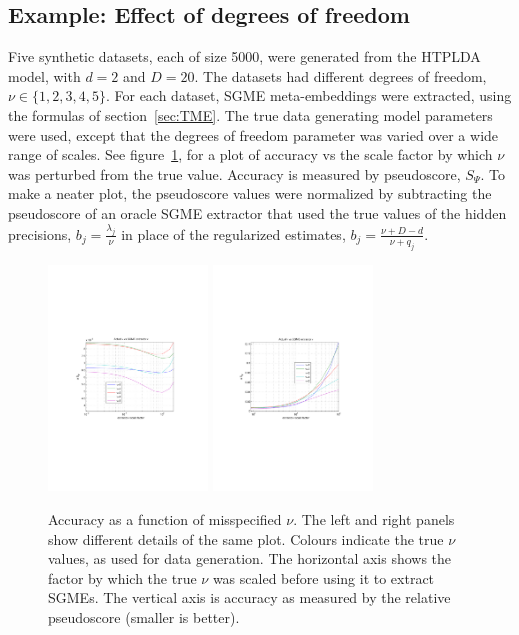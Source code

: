 \documentclass[a4paper,oneside,12pt,english]{report}
\begin{document}
\subsection{Example: Effect of degrees of freedom}
Five synthetic datasets, each of size 5000, were generated from the HTPLDA model, with $d=2$ and $D=20$. The datasets had different degrees of freedom, $\nu\in\{1,2,3,4,5\}$. For each dataset, SGME meta-embeddings were extracted, using the formulas of section~\ref{sec:TME}. The true data generating model parameters were used, except that the degrees of freedom parameter was varied over a wide range of scales. See figure~\ref{fig:nu_experiment}, for a plot of accuracy vs the scale factor by which $\nu$ was perturbed from the true value. Accuracy is measured by pseudoscore, $S_\Psi$. To make a neater plot, the pseudoscore values were normalized by subtracting the pseudoscore of an oracle SGME extractor that used the true values of the hidden precisions, $b_j=\frac{\lambda_j}{\nu}$ in place of the regularized estimates, $b_j=\frac{\nu+D-d}{\nu+q_j}$. 

\begin{figure}[htb!]
\centering
\includegraphics[height=6cm,trim={3cm 8cm 4cm 8cm},clip]{SGME_nu_experiment_a.pdf}        %
\includegraphics[height=6cm,trim={3cm 8cm 4cm 8cm},clip]{SGME_nu_experiment_b.pdf}        %
\caption[Accuracy vs degrees of freedom]{Accuracy as a function of misspecified $\nu$. The left and right panels show different details of the same plot. Colours indicate the true $\nu$ values, as used for data generation. The horizontal axis shows the factor by which the true $\nu$ was scaled before using it to extract SGMEs. The vertical axis is accuracy as measured by the relative pseudoscore (smaller is better).}
\label{fig:nu_experiment}
\end{figure}
\end{document}

